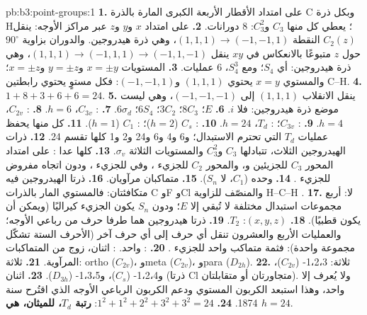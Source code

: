 \begin{solution}{pb:b3:point-groups:1}
\textbf{1.} على امتداد الأقطار الأربعة الكبرى المارة بالذرة C وبكل ذرة H؛ يعطي كل منها
$C_3$ و$C_3^2$: 8 دورانات.
\textbf{2.} على امتداد $x$ و$y$ و$z$ عبر مراكز الأوجه: ينقل $C_2(z)$ النقطة $(1,1,1)
\to (-1,-1,1)$، وهي ذرة هيدروجين. والدوران بزاوية $90^\circ$ حول $z$ متبوعًا
بالانعكاس في $xy$ ينقل $(1,1,1) \to (-1,1,1) \to (-1,1,-1)$، وهي ذرة هيدروجين: أي
$S_4$؛ ومع $S_4^3$، 6 عمليات.
\textbf{3.} المستويات $x = \pm y$ و$y = \pm z$ و$x = \pm z$؛ والمستوي $x = y$ يحتوي
$(1,1,1)$ و$(-1,-1,1)$: فكل مستوٍ يحتوي رابطتين C--H.
\textbf{4.} $1 + 8 + 3 + 6 + 6 = 24$.
\textbf{5.} ينقل الانقلاب $(1,1,1)$ إلى $(-1,-1,-1)$، وهي ليست موضع ذرة هيدروجين:
فلا $i$.
\textbf{6.} $E$؛ $8C_3$؛ $3C_2$؛ $6S_4$؛ $6\sigma_d$.
\textbf{7.} : $C_{3v}$، $h = 6$.
\textbf{8.} : $C_{2v}$، $h = 4$.
\textbf{9.} : $C_{3v}$؛ : $T_d$، $h = 24$.
\textbf{10.} : $C_s$ ($h = 2$)؛ : $C_1$ ($h = 1$).
\textbf{11.} كل منها يحفظ عمليات $T_d$ التي تحترم
الاستبدال؛ و6 و4 و6 و24 و2 و1 كلها تقسم 24.
\textbf{12.} ذرات الهيدروجين الثلاث، تتبادلها $C_3$ و$C_3^2$ والمستويات الثلاثة
$\sigma_v$.
\textbf{13.} كلها عدا : على امتداد المحور $C_3$ للجزيئين  و،
والمحور $C_2$ للجزيء ، وفي  للجزيء ، ودون
اتجاه مفروض للجزيء .
\textbf{14.}  وحده ($C_1$، لا $S_n$).
\textbf{15.} متماكبان مرآويان.
\textbf{16.} ذرتا الهيدروجين فيه متكافئتان: فالمستوي المار بالذرات C وF وCl
والمنصّف للزاوية H--C--H .
\textbf{17.} لا: أربع مجموعات استبدال مختلفة لا تُبقي إلا $E$؛ ودون $S_n$ يكون
الجزيء كيراليًا (ويمكن أن يكون قطبيًا).
\textbf{18.} $(x, y, z)$: $T_2$.
\textbf{19.} ذرتا هيدروجين هما طرفا حرف من رباعي الأوجه؛ والعمليات الأربع والعشرون
تنقل أي حرف إلى أي حرف آخر (الأحرف الستة تشكّل مجموعة واحدة): فثمة متماكب
واحد للجزيء .
\textbf{20.} : واحد. : اثنان، زوج من المتماكبات المرآوية.
\textbf{21.} ثلاثة: ortho ($C_{2v}$)، وmeta ($C_{2v}$)، وpara ($D_{2h}$).
\textbf{22.} ثلاثة: 1،2،3- ($C_{2v}$)، و1،2،4- ($C_s$)، و1،3،5- ($D_{3h}$).
\textbf{23.} اثنان (ذرتا Cl متجاورتان أو متقابلتان). ولا يُعرف إلا  واحد،
وهذا استبعد الكربون المستوي ودعم الكربون الرباعي الأوجه
الذي اقتُرح سنة 1874.
\textbf{24.} $1^2 + 1^2 + 2^2 + 3^2 + 3^2 = 24$: \textbf{رتبة $T_d$،  للميثان، هي $h = 24$}.
\end{solution}
